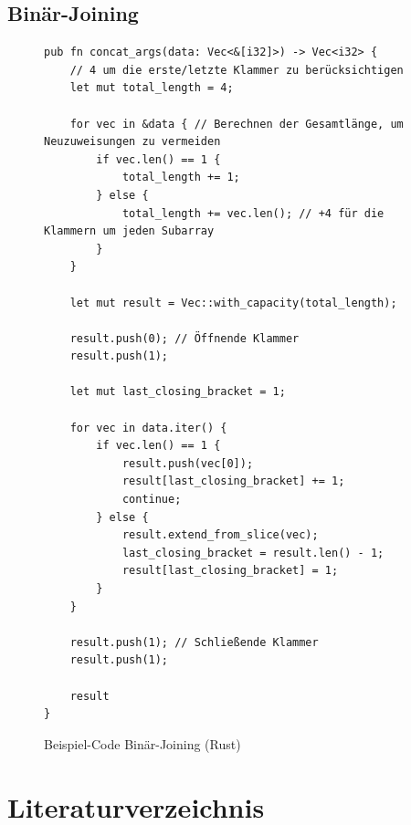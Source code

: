 \documentclass[ngerman]{article}
\begin{document}
\subsection{Binär-Joining}
\label{sec:code_nested_joining}
\begin{figure}[htbp]
  \begin{code}
    \begin{verbatim}
pub fn concat_args(data: Vec<&[i32]>) -> Vec<i32> {
    // 4 um die erste/letzte Klammer zu berücksichtigen
    let mut total_length = 4; 

    for vec in &data { // Berechnen der Gesamtlänge, um Neuzuweisungen zu vermeiden
        if vec.len() == 1 {
            total_length += 1;
        } else {
            total_length += vec.len(); // +4 für die Klammern um jeden Subarray
        }
    }

    let mut result = Vec::with_capacity(total_length);

    result.push(0); // Öffnende Klammer
    result.push(1);

    let mut last_closing_bracket = 1;

    for vec in data.iter() {
        if vec.len() == 1 {
            result.push(vec[0]);
            result[last_closing_bracket] += 1;
            continue;
        } else {
            result.extend_from_slice(vec);
            last_closing_bracket = result.len() - 1;
            result[last_closing_bracket] = 1;
        }
    }

    result.push(1); // Schließende Klammer
    result.push(1);

    result
}

    \end{verbatim}
  \end{code}

  \caption{Beispiel-Code Binär-Joining (Rust)}

\end{figure}

\pagebreak
\section{Literaturverzeichnis}

\printbibliography
\end{document}
